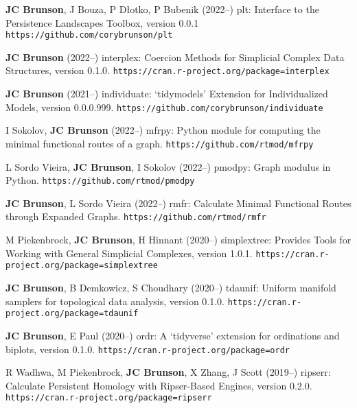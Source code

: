 \documentclass[10pt,a4paper]{article}
\begin{document}
\begin{enumerate}[label={[\arabic*]},labelindent=1cm,nolistsep]
\setcounter{enumi}{\value{paper}}
\item
{\bfseries JC Brunson}, J Bouza, P Dłotko, P Bubenik (2022--) {\sffamily plt}: Interface to the Persistence Landscapes Toolbox, version 0.0.1 {\tt\small\nolinkurl{https://github.com/corybrunson/plt}}
\item
{\bfseries JC Brunson} (2022--) {\sffamily interplex}: Coercion Methods for Simplicial Complex Data Structures, version 0.1.0. {\tt\small\nolinkurl{https://cran.r-project.org/package=interplex}}
\item
{\bfseries JC Brunson} (2021--) {\sffamily individuate}: `tidymodels' Extension for Individualized Models, version 0.0.0.999. {\tt\small\nolinkurl{https://github.com/corybrunson/individuate}}
\item
I Sokolov, {\bfseries JC Brunson} (2022--) {\sffamily mfrpy}: Python module for computing the minimal functional routes of a graph. {\tt\small\nolinkurl{https://github.com/rtmod/mfrpy}}
\item
L Sordo Vieira, {\bfseries JC Brunson}, I Sokolov (2022--) {\sffamily pmodpy}: Graph modulus in Python. {\tt\small\nolinkurl{https://github.com/rtmod/pmodpy}}
\item
{\bfseries JC Brunson}, L Sordo Vieira (2022--) {\sffamily rmfr}: Calculate Minimal Functional Routes through Expanded Graphs. {\tt\small\nolinkurl{https://github.com/rtmod/rmfr}}
\item
M Piekenbrock, {\bfseries JC Brunson}, H Hinnant (2020--) {\sffamily simplextree}: Provides Tools for Working with General Simplicial Complexes, version 1.0.1. {\tt\small\nolinkurl{https://cran.r-project.org/package=simplextree}}
\item
{\bfseries JC Brunson}, B Demkowicz, S Choudhary (2020--) {\sffamily tdaunif}: Uniform manifold samplers for topological data analysis, version 0.1.0. {\tt\small\nolinkurl{https://cran.r-project.org/package=tdaunif}}
\item
{\bfseries JC Brunson}, E Paul (2020--) {\sffamily ordr}: A `tidyverse' extension for ordinations and biplots, version 0.1.0. {\tt\small\nolinkurl{https://cran.r-project.org/package=ordr}}
\item
R Wadhwa, M Piekenbrock, {\bfseries JC Brunson}, X Zhang, J Scott (2019--) {\sffamily ripserr}: Calculate Persistent Homology with Ripser-Based Engines, version 0.2.0. {\tt\small\nolinkurl{https://cran.r-project.org/package=ripserr}}

\end{enumerate}
\end{document}
